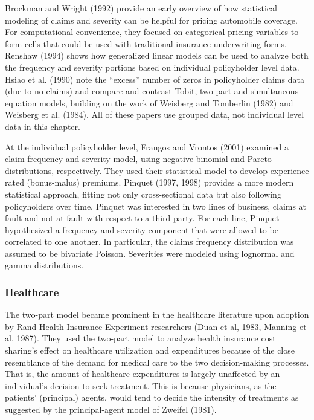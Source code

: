 Brockman and Wright (1992) provide an early overview of how
statistical modeling of claims and severity can be helpful for
pricing automobile coverage. For computational convenience, they
focused on categorical pricing variables to form cells that could be
used with traditional insurance underwriting forms. Renshaw (1994)
shows how generalized linear models can be used to analyze both the
frequency and severity portions based on individual policyholder
level data. Hsiao et al. (1990) note the ``excess'' number of zeros
in policyholder claims data (due to no claims) and compare and
contrast Tobit, two-part and simultaneous equation models, building
on the work of Weisberg and Tomberlin (1982) and Weisberg et al.
(1984). All of these papers use grouped data, not individual level
data in this chapter.

At the individual policyholder level, Frangos and Vrontos (2001)
examined a claim frequency and severity model, using negative
binomial and Pareto distributions, respectively. They used their
statistical model to develop experience rated (bonus-malus)
premiums. Pinquet (1997, 1998) provides a more modern statistical
approach, fitting not only cross-sectional data but also following
policyholders over time. Pinquet was interested in two lines of
business, claims at fault and not at fault with respect to a third
party. For each line, Pinquet hypothesized a frequency and severity
component that were allowed to be correlated to one another. In
particular, the claims frequency distribution was assumed to be
bivariate Poisson. Severities were modeled using lognormal and gamma
distributions.

\subsubsection*{Healthcare}

The two-part model became prominent in the healthcare literature
upon adoption by Rand Health Insurance Experiment researchers (Duan
et al, 1983, Manning et al, 1987). They used the two-part model to
analyze health insurance cost sharing's effect on healthcare
utilization and expenditures because of the close resemblance of the
demand for medical care to the two decision-making processes. That
is, the amount of healthcare expenditures is largely unaffected by
an individual's decision to seek treatment. This is because
physicians, as the patients' (principal) agents, would tend to
decide the intensity of treatments as suggested by the
principal-agent model of Zweifel (1981).

